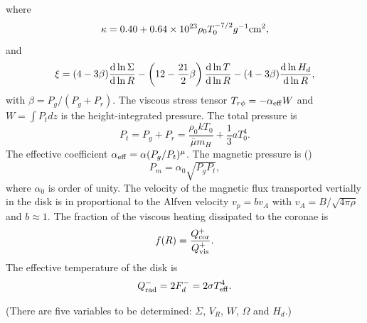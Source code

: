 \documentclass[oneside]{book}
\def\rd{{\rm d}}
\begin{document}
where 
\begin{equation}
\kappa=0.40+0.64\times10^{23}\rho_0 T_0^{-7/2} g^{-1}{\rm cm}^2,
\end{equation}
and 
\begin{equation}
\xi=(4-3\beta)\frac{\rd\ln\Sigma}{\rd\ln R}-\left(12-\frac{21}{2}\beta\right)\frac{\rd\ln T}{\rd\ln R}-
(4-3\beta)\frac{\rd\ln H_d}{\rd\ln R},
\end{equation}
with $\beta=P_g/(P_g+P_r)$.
The viscous stress tensor $T_{r\phi}=-\alpha_{\rm eff}W$ and $W=\int P_t d z$ is the height-integrated pressure.
The total pressure is
\begin{equation}
 P_t=P_g+P_r=\frac{\rho_0 k T_0}{\bar\mu m_H} + \frac{1}{3}aT_0^4.
\end{equation}
The effective coefficient $\alpha_{\rm eff}=\alpha(P_g/P_t)^\mu$. The magnetic pressure is (\citealt{Merloni2003})
\begin{equation}
P_m=\alpha_0\sqrt{P_gP_t},
\end{equation}
where $\alpha_0$ is order of unity. The velocity of the magnetic flux transported vertially in the disk is in proportional
to the Alfven velocity $v_p=bv_A$ with $v_A=B/\sqrt{4\pi\rho}$ and $b\approx1$.
The fraction of the viscous heating dissipated to the coronae is
\begin{equation}
f(R)=\frac{Q_{\rm cor}^+}{Q_{\rm vis}^+}.
\end{equation}
The effective temperature of the disk is
\begin{equation}
Q_{\rm rad}^-=2F_d^-=2\sigma T_{\rm eff}^4.
\end{equation}

(There are {\color{blue} five} variables to be determined: 
{\color{blue}$\Sigma$, $V_R$, $W$, $\Omega$ and $H_d$}.)
\end{document}
